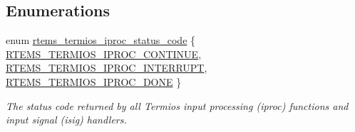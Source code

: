 \subsection*{Enumerations}
\begin{DoxyCompactItemize}
\item 
enum \mbox{\hyperlink{group__Termios_ga8d00143bb99772a960e237f16437fc1b}{rtems\+\_\+termios\+\_\+iproc\+\_\+status\+\_\+code}} \{ \mbox{\hyperlink{group__Termios_gga8d00143bb99772a960e237f16437fc1bae9a05995f485b7c6cb51a8cfa473e955}{R\+T\+E\+M\+S\+\_\+\+T\+E\+R\+M\+I\+O\+S\+\_\+\+I\+P\+R\+O\+C\+\_\+\+C\+O\+N\+T\+I\+N\+UE}}, 
\mbox{\hyperlink{group__Termios_gga8d00143bb99772a960e237f16437fc1baf7b4b4f7736fd154021de342202e4914}{R\+T\+E\+M\+S\+\_\+\+T\+E\+R\+M\+I\+O\+S\+\_\+\+I\+P\+R\+O\+C\+\_\+\+I\+N\+T\+E\+R\+R\+U\+PT}}, 
\mbox{\hyperlink{group__Termios_gga8d00143bb99772a960e237f16437fc1ba8fbe8ec8425eb685f8e5fc72a50178c1}{R\+T\+E\+M\+S\+\_\+\+T\+E\+R\+M\+I\+O\+S\+\_\+\+I\+P\+R\+O\+C\+\_\+\+D\+O\+NE}}
 \}
\begin{DoxyCompactList}\small\item\em The status code returned by all Termios input processing (iproc) functions and input signal (isig) handlers. \end{DoxyCompactList}\end{DoxyCompactItemize}
